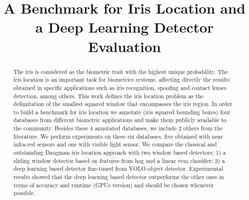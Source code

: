\documentclass[conference]{IEEEtran}
\begin{document}
\title{A Benchmark for Iris Location and a Deep Learning Detector Evaluation}

\author{
}


\maketitle


\begin{abstract}
The iris is considered as the biometric trait with the highest unique probability.
The iris location is an important task for biometrics systems, affecting directly the results obtained in specific applications such as iris recognition, spoofing and contact lenses detection, among others.
This work defines the iris location problem as the delimitation of the smallest squared window that encompasses the iris region.
In order to build a benchmark for iris location we annotate (iris squared bounding boxes) four databases from different biometric applications and make them publicly available to the community.
Besides these 4 annotated databases, we include 2 others from the literature. We perform experiments on these six databases, five obtained with near infra-red sensors and one with visible light sensor.
We compare the classical and outstanding Daugman iris location approach with two window based detectors:
1) a sliding window detector based on features from \gls*{hog} and a linear \gls*{svm} classifier;
2) a deep learning based detector fine-tuned from YOLO object detector.
Experimental results showed that the deep learning based detector outperforms the other ones in terms of accuracy and runtime (GPUs version) and should be chosen whenever possible.
\end{abstract}
\end{document}
